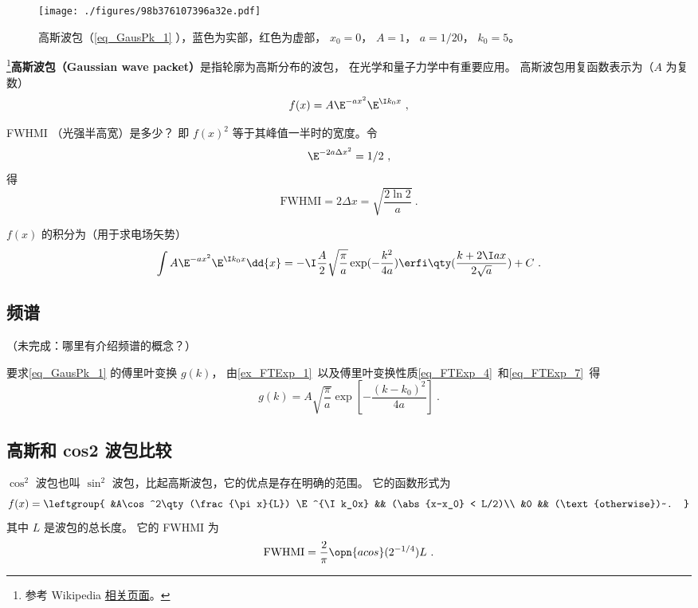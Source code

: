 

\begin{figure}[ht]
\centering
\texttt{[image: ./figures/98b376107396a32e.pdf]}
\caption{高斯波包（\autoref{eq_GausPk_1} ），蓝色为实部，红色为虚部， $x_0 = 0$， $A = 1$， $a = 1/20$， $k_0 = 5$。} \label{fig_GausPk_1}
\end{figure}

\footnote{参考 Wikipedia \href{https://en.wikipedia.org/wiki/Wave_packet}{相关页面}。}\textbf{高斯波包（Gaussian wave packet）}是指轮廓为高斯分布的波包， 在光学和量子力学中有重要应用。 高斯波包用复函数表示为（$A$ 为复数）
\begin{equation}\label{eq_GausPk_1}
f(x) = A \E^{-a x^2}\E^{\I k_0 x}~,
\end{equation}

FWHMI （光强半高宽）是多少？ 即 $f(x)^2$ 等于其峰值一半时的宽度。令
\begin{equation}
\E^{-2a\Delta x^2} = 1/2~,
\end{equation}
得
\begin{equation}
\mathrm{FWHMI} = 2\Delta x = \sqrt{\frac{2\ln 2}{a}}~.
\end{equation}

$f(x)$ 的积分为（用于求电场矢势）
\begin{equation}\label{eq_GausPk_3} %
\int A \E^{-a x^2}\E^{\I k_0 x} \dd{x} = -\I\frac{A}{2} \sqrt{\frac{\pi}{a}} \exp(-\frac{k^2}{4a}) \erfi\qty(\frac{k + 2 \I a x}{2 \sqrt{a}}) + C~.
\end{equation}


\subsection{频谱}
（未完成：哪里有介绍频谱的概念？）

要求\autoref{eq_GausPk_1} 的傅里叶变换 $g(k)$， 由\autoref{ex_FTExp_1}~以及傅里叶变换性质\autoref{eq_FTExp_4}~和\autoref{eq_FTExp_7}~得
\begin{equation}
g(k) = A\sqrt{\frac{\pi}{a}} \exp[-\frac{(k-k_0)^2}{4a}]~.
\end{equation}

\subsection{高斯和 cos2 波包比较}
$\cos^2$ 波包也叫 $\sin^2$ 波包，比起高斯波包，它的优点是存在明确的范围。 它的函数形式为
\begin{equation}
f(x) = \leftgroup{
&A\cos^2\qty(\frac{\pi x}{L}) \E^{\I k_0x} && (\abs{x-x_0} < L/2)\\
&0 && (\text{otherwise})~.
}\end{equation}
其中 $L$ 是波包的总长度。 它的 FWHMI 为
\begin{equation}\label{eq_GausPk_4}
\text{FWHMI} = \frac{2}{\pi}\opn{acos}(2^{-1/4}) L~.
\end{equation}

